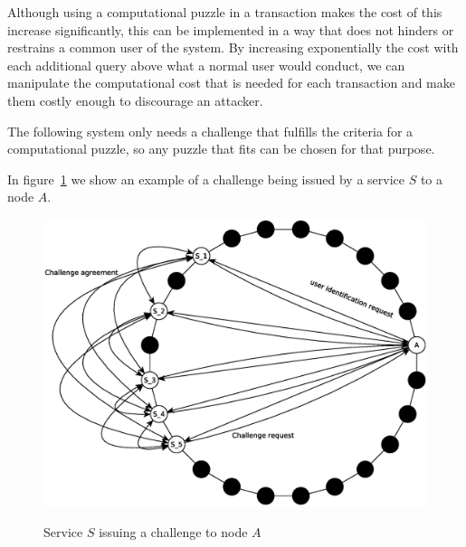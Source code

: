 
Although using a computational puzzle in a transaction makes the cost of this
increase significantly, this can be implemented in a way that does not hinders
or restrains a common user of the system.
By increasing exponentially the cost with each additional
query above what a normal user would conduct, we can manipulate the computational cost that is needed for each
transaction and make them costly enough to discourage an attacker.





 The following system only needs a challenge that fulfills the
criteria for a computational puzzle, so any puzzle that fits can be chosen for
that purpose.

In figure~\ref{fig:challenge} we show an example of a challenge being issued by a
service $S$ to a node $A$.

\begin{figure}[!htb]
\centering
\includegraphics[width=14cm]{../img/challenge}\\
\caption{Service $S$ issuing a  challenge to node $A$}
\label{fig:challenge}
\end{figure}

